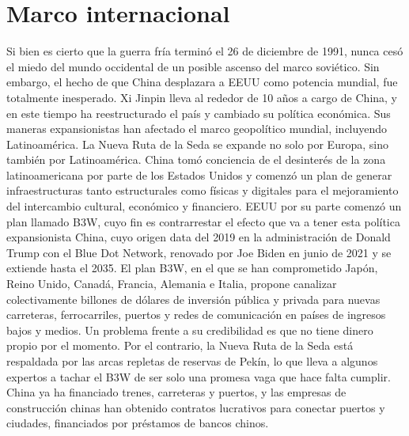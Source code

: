 \documentclass{article}
\begin{document}
\section{Marco internacional}
Si bien es cierto que la guerra fría terminó el 26 de diciembre de 1991, nunca
cesó el miedo del mundo occidental de un posible ascenso del marco soviético. Sin embargo, el hecho de que China desplazara a EEUU como potencia mundial, fue totalmente inesperado.
\newline
\newline
Xi Jinpin lleva al rededor de 10 años a cargo de China, y en este tiempo ha reestructurado el país y cambiado su política económica. 
\newline
\newline
Sus maneras expansionistas han afectado el marco geopolítico mundial, incluyendo Latinoamérica. 
\newline
\newline
La Nueva Ruta de la Seda se expande no solo por Europa, sino también por Latinoamérica.
China tomó conciencia de el desinterés de la zona latinoamericana por parte de los Estados Unidos y comenzó un plan de generar infraestructuras tanto estructurales como físicas y digitales para el mejoramiento del intercambio cultural, económico y financiero.
\newline
\newline
EEUU por su parte comenzó un plan llamado B3W, cuyo fin es contrarrestar el efecto que va a tener esta política expansionista China, cuyo origen data del 2019 en la administración de Donald Trump con el Blue Dot Network, renovado por Joe Biden en junio de 2021 y se extiende hasta el 2035. El plan B3W, en el que se han comprometido Japón, Reino Unido, Canadá, Francia, Alemania e Italia, propone canalizar colectivamente billones de dólares de inversión pública y privada para nuevas carreteras, ferrocarriles, puertos y redes de comunicación en países de ingresos bajos y medios. Un problema frente a su credibilidad es que no tiene dinero propio por el momento.
\newline
\newline
Por el contrario, la Nueva Ruta de la Seda está respaldada por las arcas repletas de reservas de Pekín, lo que lleva a algunos expertos a tachar el B3W de ser solo una promesa vaga que hace falta cumplir. China ya ha financiado trenes, carreteras y puertos, y las empresas de construcción chinas han obtenido contratos lucrativos para conectar puertos y ciudades, financiados por préstamos de bancos chinos.
\newline
\end{document}
